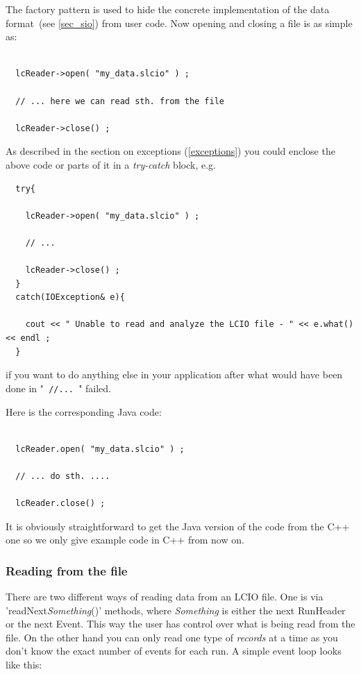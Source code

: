 \documentclass[twoside]{article}
\begin{document}
The factory pattern is used to hide  the concrete implementation of the data 
format~(see \ref{sec_sio}) from user code.
Now opening and closing a file is as simple as:
\begin{verbatim}

  lcReader->open( "my_data.slcio" ) ;
    
  // ... here we can read sth. from the file 

  lcReader->close() ;

\end{verbatim}
As described in the section on exceptions (\ref{exceptions}) you could enclose the above code or parts 
of it in a {\em try-catch} block, e.g.

\begin{verbatim}
  try{
    
    lcReader->open( "my_data.slcio" ) ;
    
    // ...

    lcReader->close() ;
  }
  catch(IOException& e){

    cout << " Unable to read and analyze the LCIO file - " << e.what() << endl ;
  }
\end{verbatim}
if you want to do anything else in your application after what would have been done in 
"\verb$ //... $" failed.


Here is the corresponding Java code:
\begin{verbatim}

  lcReader.open( "my_data.slcio" ) ;

  // ... do sth. ....

  lcReader.close() ;

\end{verbatim}
It is obviously straightforward to get the Java version of the code from the C++ one
so we only give example code in C++ from now on.

\subsubsection{Reading from the file}
There are two different ways of reading data from an LCIO file. One is via 
'readNext{\em Something}()' methods, where {\em Something} is either the next RunHeader or the next 
Event. This way the user has control over what is being read from the file. On the other hand you 
can only read one type of {\em records } at a time as you don't know the exact number of events for 
each run. A simple event loop looks like this: 
\end{document}
